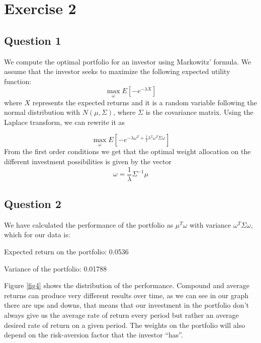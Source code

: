\chapter{Exercise 2}

\section{Question 1}
We compute the optimal portfolio for an investor using Markowitz' formula. We assume that the investor seeks to maximize the following expected utility function:
\begin{equation*}
\max_\omega E\left[-e^{-\lambda X}\right]
\end{equation*}
where $X$ represents the expected returns and it is a random variable following the normal distribution with $N(\mu, \Sigma)$, where $\Sigma$ is the covariance matrix. Using the Laplace transform, we can rewrite it as

\begin{equation*}
\max_\omega E\left[-e^{{-\lambda \omega^T+}\frac{1}{2}\lambda^2\omega^T\Sigma\omega}\right]
\end{equation*}
From the first order conditions we get that the optimal weight allocation on the different investment possibilities is given by the vector
\begin{equation*}
\omega = \frac{1}{\lambda}\Sigma^{-1}\mu
\end{equation*}

\section{Question 2}

We have calculated the performance of the portfolio as $\mu^T\omega$ with variance $\omega^T\Sigma\omega$, which for our data is: \bigskip

Expected return on the portfolio: 0.0536

Variance of the portfolio: 0.01788 \bigskip

Figure \ref{fig4} shows the distribution of the performance. Compound and average returns can produce very different results over time, as we can see in our graph there are ups and downs, that means that our investment in the portfolio don’t always give us the average rate of return every period but rather an average desired rate of return on a given period. The weights on the portfolio will also depend on the risk-aversion factor that the investor “has”.

